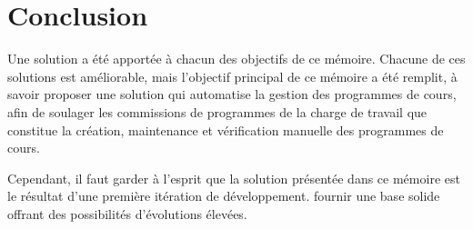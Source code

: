 \chapter{Conclusion}
\label{conclusion}
Une solution a été apportée à chacun des objectifs de ce mémoire. Chacune de ces solutions est améliorable, mais l'objectif principal de ce mémoire a été remplit, à savoir proposer une solution qui automatise la gestion des programmes de cours, afin de soulager les commissions de programmes de la charge de travail que constitue la création, maintenance et vérification manuelle des programmes de cours.

Cependant, il faut garder à l'esprit que la solution présentée dans ce mémoire est le résultat d'une première itération de développement.  fournir une base solide offrant des possibilités d'évolutions élevées. 
